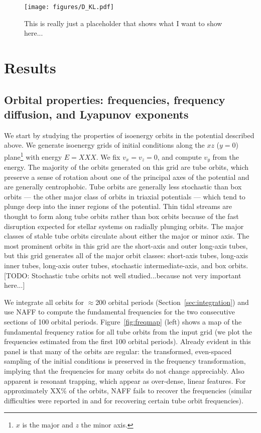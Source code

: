 \documentclass[letterpaper,12pt,preprint]{aastex}
\begin{document}
\begin{figure}[!h]
\begin{center}
\texttt{[image: figures/D\_KL.pdf]}
\caption{This is really just a placeholder that shows what I want to show here...} \label{fig:DKL}
\end{center}
\end{figure}

\section{Results}\label{sec:results}

\subsection{Orbital properties: frequencies, frequency diffusion, and Lyapunov exponents}

We start by studying the properties of isoenergy orbits in the potential described above. We generate isoenergy grids of initial conditions along the $xz$ ($y=0$) plane\footnote{$x$ is the major and $z$ the minor axis.} with energy $E=XXX$. We fix $v_x = v_z = 0$, and compute $v_y$ from the energy. The majority of the orbits generated on this grid are tube orbits, which preserve a sense of rotation about one of the principal axes of the potential and are generally centrophobic. Tube orbits are generally less stochastic than box orbits --- the other major class of orbits in triaxial potentials --- which tend to plunge deep into the inner regions of the potential. Thin tidal streams are thought to form along tube orbits rather than box orbits because of the fast disruption expected for stellar systems on radially plunging orbits. The major classes of stable tube orbits circulate about either the major or minor axis. The most prominent orbits in this grid are the short-axis and outer long-axis tubes, but this grid generates all of the major orbit classes: short-axis tubes, long-axis inner tubes, long-axis outer tubes, stochastic intermediate-axis, and box orbits. [TODO: Stochastic tube orbits not well studied...because not very important here...]

We integrate all orbits for $\approx$200 orbital periods (Section~\ref{sec:integration}) and use NAFF to compute the fundamental frequencies for the two consecutive sections of 100 orbital periods. Figure~\ref{fig:freqmap} (left) shows a map of the fundamental frequency ratios for all tube orbits from the input grid (we plot the frequencies estimated from the first 100 orbital periods). Already evident in this panel is that many of the orbits are regular: the transformed, even-spaced sampling of the initial conditions is preserved in the frequency transformation, implying that the frequencies for many orbits do not change appreciably. Also apparent is resonant trapping, which appear as over-dense, linear features. For approximately XX\% of the orbits, NAFF fails to recover the frequencies (similar difficulties were reported in \cite{valluri98} and \cite{papaphilippou96} for recovering certain tube orbit frequencies).
\end{document}
